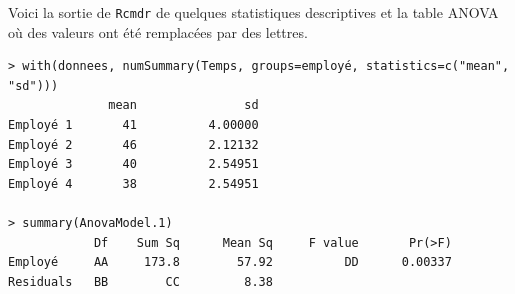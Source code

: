 \begin{questions}
Voici la sortie de \texttt{Rcmdr} de quelques statistiques descriptives et la table ANOVA où des valeurs ont été remplacées par des lettres.


\begin{verbatim} 
> with(donnees, numSummary(Temps, groups=employé, statistics=c("mean", "sd")))
              mean               sd
Employé 1       41          4.00000
Employé 2       46          2.12132
Employé 3       40          2.54951
Employé 4       38          2.54951

> summary(AnovaModel.1)
            Df    Sum Sq      Mean Sq     F value       Pr(>F)
Employé     AA     173.8        57.92          DD      0.00337
Residuals   BB        CC         8.38
\end{verbatim}

\end{questions}
